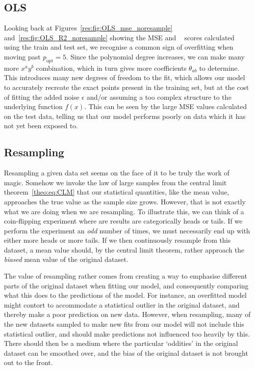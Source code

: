 \documentclass[twocolumn,english,notitlepage]{article}
\DeclareMathOperator{\Rsquared}{R^2}
\newcommand{\msub}[2]{\ensuremath{{#1}_\text{#2}}}
\begin{document}
    \subsection{OLS}
        Looking back at Figures~\ref{res:fig:OLS_mse_noresample} and~\ref{res:fig:OLS_R2_noresample} showing the MSE and $\Rsquared$ scores calculated using the train and test set, we recognise a common sign of overfitting when moving past $\msub{p}{opt} = 5$. Since the polynomial degree increases, we can make many more $x^ay^b$ combination, which in turn gives more coefficients $\theta_{ab}$ to determine. This introduces many new degrees of freedom to the fit, which allows our model to accurately recreate the exact points present in the training set, but at the cost of fitting the added noise $\epsilon$ and/or assuming a too complex structure to the underlying function $f(x)$. This can be seen by the large MSE values calculated on the test data, telling us that our model performs poorly on data which it has not yet been exposed to.

    \subsection{Resampling}
        Resampling a given data set seems on the face of it to be truly the work of magic. Somehow we invoke the law of large samples from the central limit theorem~\eqref{theo:eq:CLM} that our statistical quantities, like the mean value, approaches the true value as the sample size grows. However, that is not exactly what we are doing when we are resampling. To illustrate this, we can think of a coin-flipping experiment where are results are categorically heads or tails. If we perform the experiment an \textit{odd} number of times, we must necessarily end up with either more heads or more tails. If we then continuously resample from this dataset, a mean value should, by the central limit theorem, rather approach the \textit{biased} mean value of the original dataset.

        The value of resampling rather comes from creating a way to emphasise different parts of the original dataset when fitting our model, and consequently comparing what this does to the predictions of the model. For instance, an overfitted model might contort to accommodate a statistical outlier in the original dataset, and thereby make a poor prediction on new data. However, when resampling, many of the new datasets sampled to make new fits from our model will not include this statistical outlier, and should make predictions not influenced too heavily by this. There should then be a medium where the particular `oddities' in the original dataset can be smoothed over, and the bias of the original dataset is not brought out to the front.
\end{document}
